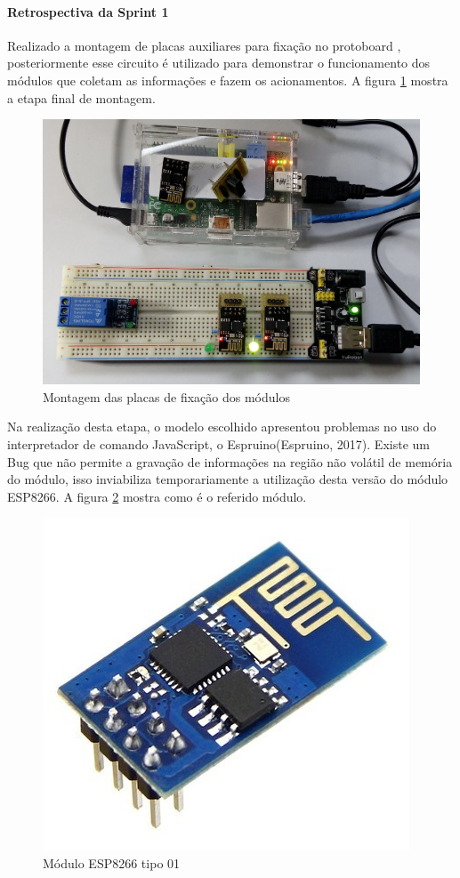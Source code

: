 \paragraph{Retrospectiva da Sprint 1} Realizado a montagem de placas auxiliares para fixação no protoboard , posteriormente esse circuito é utilizado para demonstrar o funcionamento dos módulos que coletam as informações e fazem os acionamentos. A figura \ref{ysto-preeview} mostra a etapa final de montagem.

\begin{figure}[H]
\caption{\label{ysto-preeview} Montagem das placas de fixação dos módulos}
\includegraphics[scale=0.15]{img/ysto-preview.jpg}
\end{figure}

Na realização desta etapa, o modelo escolhido apresentou problemas no uso do interpretador de comando JavaScript, o Espruino(Espruino, 2017). Existe um Bug que não permite a gravação de informações na região não volátil de memória do módulo, isso inviabiliza temporariamente a utilização desta versão do módulo ESP8266. A figura \ref{ma-preeview} mostra como é o referido módulo.

\begin{figure}[H]
\caption{\label{ma-preeview} Módulo ESP8266 tipo 01}
\includegraphics[scale=0.25]{img/esp8266-01.png}
\end{figure}

